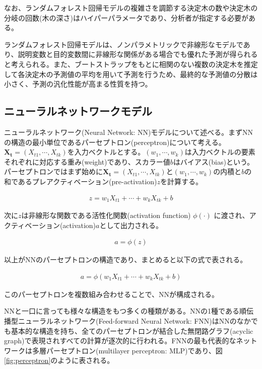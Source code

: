 \documentclass[a4paper, 12pt]{jsarticle}
\begin{document}
なお、ランダムフォレスト回帰モデルの複雑さを調節する決定木の数や決定木の分岐の回数(木の深さ)はハイパーパラメータであり、分析者が指定する必要がある。

ランダムフォレスト回帰モデルは、ノンパラメトリックで非線形なモデルであり、説明変数と目的変数間に非線形な関係がある場合でも優れた予測が得られると考えられる。また、ブートストラップをもとに相関のない複数の決定木を推定して各決定木の予測値の平均を用いて予測を行うため、最終的な予測値の分散は小さく、予測の汎化性能が高まる性質を持つ。

\subsection{ニューラルネットワークモデル}

ニューラルネットワーク(Neural Network: NN)モデルについて述べる。まずNNの構造の最小単位であるパーセプトロン(perceptron)について考える。$\bm{X_t}=(X_{t1}, \cdots, X_{tk})$を入力ベクトルとする。$(w_1, \cdots, w_k)$は入力ベクトルの要素それぞれに対応する重み(weight)であり、スカラー値$b$はバイアス(bias)という。パーセプトロンではまず始めに$\bm{X_t}=(X_{t1}, \cdots, X_{tk})$と$(w_1, \cdots, w_k)$の内積と$b$の和であるプレアクティベーション(pre-activation)$z$を計算する。

\begin{equation}
  \begin{split}
    z = w_1 X_{t1} + \cdots + w_k X_{tk} + b
  \end{split}
\end{equation}

次に$z$は非線形な関数である活性化関数(activation function) $\phi(\cdot)$ に渡され、アクティベーション(activation)$a$として出力される。

\begin{equation}
  \begin{split}
    a = \phi(z)
  \end{split}
\end{equation}

以上がNNのパーセプトロンの構造であり、まとめると以下の式で表される。

\begin{equation}
  \begin{split}
    a = \phi(w_1 X_{t1} + \cdots + w_k X_{tk} + b)
  \end{split}
\end{equation}

このパーセプトロンを複数組み合わせることで、NNが構成される。

NNと一口に言っても様々な構造をもつ多くの種類がある。NNの1種である順伝播型ニューラルネットワーク(Feed-forward Neural Network: FNN)はNNのなかでも基本的な構造を持ち、全てのパーセプトロンが結合した無閉路グラフ(acyclic graph)で表現されすべての計算が逐次的に行われる。FNNの最も代表的なネットワークは多層パーセプトロン(multilayer perceptron: MLP)であり、図\ref{fig:perceptron}のように表される。
\end{document}
